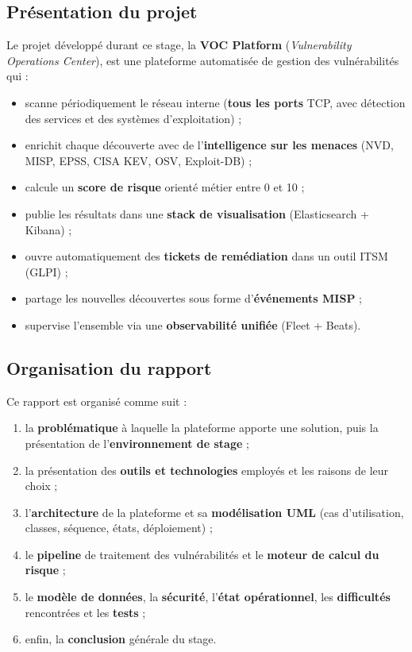 \documentclass[11pt,a4paper]{article}
\begin{document}
\subsection{Pr\'esentation du projet}

Le projet d\'evelopp\'e durant ce stage, la \textbf{VOC Platform}
(\emph{Vulnerability Operations Center}), est une plateforme automatis\'ee de
gestion des vuln\'erabilit\'es qui :

\begin{itemize}[leftmargin=1.6em]
  \item scanne p\'eriodiquement le r\'eseau interne (\textbf{tous les ports}
        TCP, avec d\'etection des services et des syst\`emes d'exploitation) ;
  \item enrichit chaque d\'ecouverte avec de l'\textbf{intelligence sur les
        menaces} (NVD, MISP, EPSS, CISA KEV, OSV, Exploit-DB) ;
  \item calcule un \textbf{score de risque} orient\'e m\'etier entre 0 et 10 ;
  \item publie les r\'esultats dans une \textbf{stack de visualisation}
        (Elasticsearch + Kibana) ;
  \item ouvre automatiquement des \textbf{tickets de rem\'ediation} dans un
        outil ITSM (GLPI) ;
  \item partage les nouvelles d\'ecouvertes sous forme d'\textbf{\'ev\'enements
        MISP} ;
  \item supervise l'ensemble via une \textbf{observabilit\'e unifi\'ee}
        (Fleet + Beats).
\end{itemize}

\subsection{Organisation du rapport}

Ce rapport est organis\'e comme suit :

\begin{enumerate}[leftmargin=1.6em]
  \item la \textbf{probl\'ematique} \`a laquelle la plateforme apporte une
        solution, puis la pr\'esentation de l'\textbf{environnement de stage} ;
  \item la pr\'esentation des \textbf{outils et technologies} employ\'es et
        les raisons de leur choix ;
  \item l'\textbf{architecture} de la plateforme et sa \textbf{mod\'elisation
        UML} (cas d'utilisation, classes, s\'equence, \'etats, d\'eploiement) ;
  \item le \textbf{pipeline} de traitement des vuln\'erabilit\'es et le
        \textbf{moteur de calcul du risque} ;
  \item le \textbf{mod\`ele de donn\'ees}, la \textbf{s\'ecurit\'e},
        l'\textbf{\'etat op\'erationnel}, les \textbf{difficult\'es}
        rencontr\'ees et les \textbf{tests} ;
  \item enfin, la \textbf{conclusion} g\'en\'erale du stage.
\end{enumerate}
\end{document}
